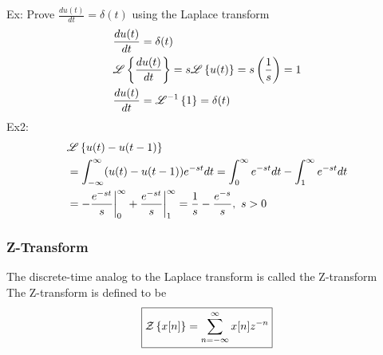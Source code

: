 \documentclass[11pt, fleqn]{article}
\begin{document}
Ex: Prove $\frac{du(t)}{dt}=\delta(t)$ using the Laplace transform
\begin{align*}
    &\frac{du(t)}{dt}=\delta(t)\\
    &\mathscr{L}\left\{ \frac{du(t)}{dt} \right\}=s\mathscr{L}\left\{ u(t) \right\}=s\left(\frac{1}{s}\right)=1\\
    &\frac{du(t)}{dt}=\mathscr{L}^{-1}\left\{ 1 \right\}=\delta(t)
\end{align*}
Ex2:
\begin{align*}
    &\lap\brcurly{u(t)-u(t-1)}\\
    &=\int_{-\infty}^\infty(u(t)-u(t-1))e^{-st}dt=\int_0^\infty e^{-st}dt-\int_1^\infty e^{-st}dt\\
    &=-\frac{e^{-st}}{s}\eval_0^\infty+\frac{e^{-st}}{s}\eval_1^\infty=\frac{1}{s}-\frac{e^{-s}}{s},\ s>0
\end{align*}

\subsubsection{Z-Transform}
The discrete-time analog to the Laplace transform is called the Z-transform\\
The Z-transform is defined to be
$$\boxed{\mathcal{Z}\left\{ x[n] \right\}=\sum_{n=-\infty}^\infty x[n]z^{-n}}$$
\end{document}
